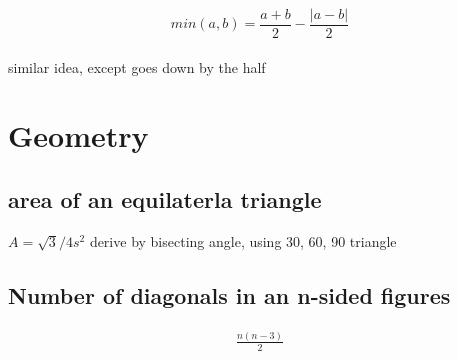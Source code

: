 \documentclass[a4paper, 12pt]{article}
\newcommand{\eq}[1]{\begin{align*}#1\end{align*}} %
\renewcommand{\eq}[1]{\begin{align*}#1\end{align*}} %
\newcommand{\gray}[1]{\textcolor[gray]{0.5}{#1}} %
\begin{document}
$$min(a, b) = \frac{a+b}{2} - \frac{|a-b|}{2}$$ \\
\gray{similar idea, except goes down by the half}

\section*{Geometry}
\subsection*{area of an equilaterla triangle}
$A = \sqrt{3}/4 s^2$
\gray{derive by bisecting angle, using 30, 60, 90 triangle}

\subsection*{Number of diagonals in an n-sided figures}

\eq{\frac{n(n-3)}{2}}
\end{document}
